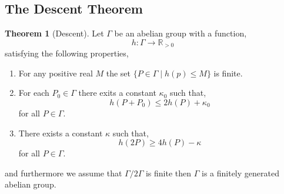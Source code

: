 \documentclass{article}
\newcommand{\R}{\mathbb{R}}
\theoremstyle{definition}
\newtheorem{theorem}{Theorem}[section]
\begin{document}
\subsection{The Descent Theorem}

\begin{theorem}[Descent]
Let $\Gamma$ be an abelian group with a function,
\[ h : \Gamma \to \R_{> 0} \]
satisfying the following properties,
\begin{enumerate}
\item For any positive real $M$ the set $\{ P \in \Gamma \mid h(p) \le M \}$ is finite. 
\item For each $P_0 \in \Gamma$ there exits a constant $\kappa_0$ such that,
\[ h(P + P_0) \le 2 h(P) + \kappa_0 \]
for all $P \in \Gamma$.
\item There exists a constant $\kappa$ such that,
\[ h(2 P) \ge 4 h(P) - \kappa \]
for all $P \in \Gamma$.
\end{enumerate}
and furthermore we assume that $\Gamma / 2 \Gamma$ is finite then $\Gamma$ is a finitely generated abelian group. 
\end{theorem}
\end{document}

